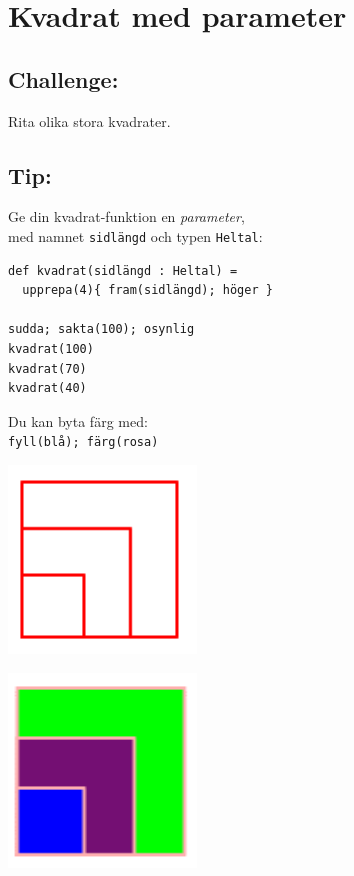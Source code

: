 \chapter{Kvadrat med parameter}
\begin{multicols}{2}
\section*{\color{BrickRed}Challenge:}
Rita olika stora kvadrater.
\section*{\color{OliveGreen}Tip:}
Ge din kvadrat-funktion en {\it parameter},\\
med namnet \lstinline{sidlängd} och typen \lstinline{Heltal}:

\begin{lstlisting}[basicstyle={\ttfamily\fontsize{16}{19}\selectfont},numbers=none]
def kvadrat(sidlängd : Heltal) = 
  upprepa(4){ fram(sidlängd); höger }

sudda; sakta(100); osynlig
kvadrat(100) 
kvadrat(70)
kvadrat(40)
\end{lstlisting}
        
Du kan byta färg med:\\
\lstinline{fyll(blå); färg(rosa)}


\columnbreak


\begin{center}
\includegraphics[width=5.0cm]{../img/square-param.png}
\end{center}

\begin{center}
\includegraphics[width=5.0cm]{../img/square-param-color.png}
\end{center}

\end{multicols}

